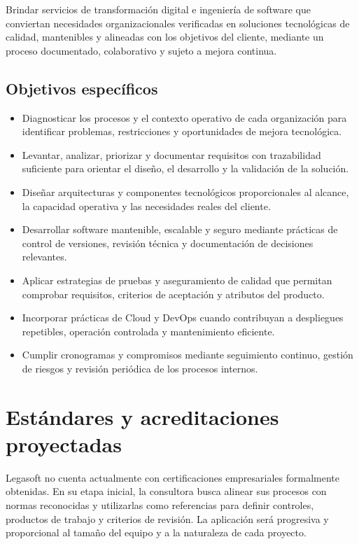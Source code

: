 Brindar servicios de transformación digital e ingeniería de software que
conviertan necesidades organizacionales verificadas en soluciones tecnológicas de
calidad, mantenibles y alineadas con los objetivos del cliente, mediante un
proceso documentado, colaborativo y sujeto a mejora continua.

\subsection{Objetivos específicos}

\begin{itemize}
  \item Diagnosticar los procesos y el contexto operativo de cada organización
        para identificar problemas, restricciones y oportunidades de mejora
        tecnológica.
  \item Levantar, analizar, priorizar y documentar requisitos con trazabilidad
        suficiente para orientar el diseño, el desarrollo y la validación de la
        solución.
  \item Diseñar arquitecturas y componentes tecnológicos proporcionales al
        alcance, la capacidad operativa y las necesidades reales del cliente.
  \item Desarrollar software mantenible, escalable y seguro mediante prácticas de
        control de versiones, revisión técnica y documentación de decisiones
        relevantes.
  \item Aplicar estrategias de pruebas y aseguramiento de calidad que permitan
        comprobar requisitos, criterios de aceptación y atributos del producto.
  \item Incorporar prácticas de Cloud y DevOps cuando contribuyan a despliegues
        repetibles, operación controlada y mantenimiento eficiente.
  \item Cumplir cronogramas y compromisos mediante seguimiento continuo, gestión
        de riesgos y revisión periódica de los procesos internos.
\end{itemize}

\section{Estándares y acreditaciones proyectadas}

Legasoft no cuenta actualmente con certificaciones empresariales formalmente
obtenidas. En su etapa inicial, la consultora busca alinear sus procesos con
normas reconocidas y utilizarlas como referencias para definir controles,
productos de trabajo y criterios de revisión. La aplicación será progresiva y
proporcional al tamaño del equipo y a la naturaleza de cada proyecto.

